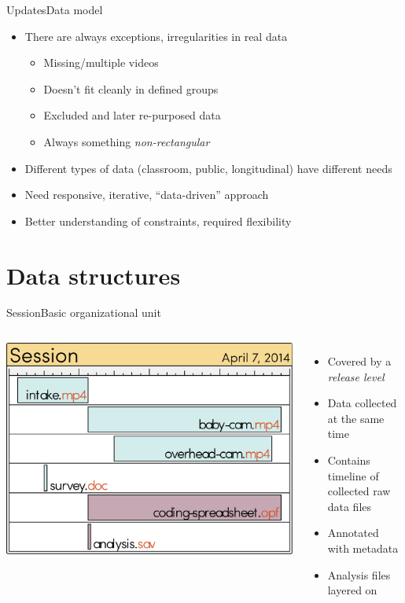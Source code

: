 \documentclass[aspectratio=169,14pt]{beamer}
\begin{document}
\begin{frame}{Updates}{Data model}
	\begin{itemize}
		\item There are always exceptions, irregularities in real data
		\begin{itemize}
			\item Missing/multiple videos
			\item Doesn't fit cleanly in defined groups
			\item Excluded and later re-purposed data
			\item Always something \emph{non-rectangular}
		\end{itemize}
		\item Different types of data (classroom, public, longitudinal) have different needs
		\item Need responsive, iterative, ``data-driven'' approach
		\item Better understanding of constraints, required flexibility
	\end{itemize}
\end{frame}

\section{Data structures}

\begin{frame}{Session}{Basic organizational unit}
	\begin{columns}
	\column{2.5in}
	\includegraphics[width=\textwidth]{session.pdf}

	\column{\textwidth-2.25in}
	\begin{itemize}
		\item Covered by a \emph{release level}
		\item Data collected at the same time
		\item Contains timeline of collected raw data files
		\item Annotated with metadata
		\item Analysis files layered on
	\end{itemize}

	\end{columns}
\end{frame}
\end{document}
